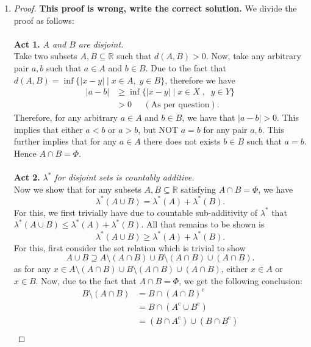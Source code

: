 \documentclass{article}
\theoremstyle{definition}
\theoremstyle{remark}
\theoremstyle{definition}
\theoremstyle{definition}
\theoremstyle{definition}
\newcommand{\abs}[1]{\left \vert #1\right \vert}
\newcommand{\union}{\cup}
\newcommand{\intrs}{\cap}
\newcommand{\where}{\;\vert\;}
\newcommand{\R}{\mathbb{R}}
\newcommand{\comp}[1]{#1^{\text{c}}}
\newcommand{\lom}[1]{\lambda^*\left (#1\right )}
\begin{document}
\begin{enumerate}
{\begin{proof}
 \end{proof}}
\item {\begin{proof} \textbf{This proof is wrong, write the correct solution.} We divide the proof as follows:\\\\
		\textbf{Act 1.} \emph{$ A $ and $ B $ are disjoint.}\\
		Take two subsets $ A,B \subseteq \R $ such that $ d(A,B) >0 $. Now, take any arbitrary pair $ a,b $ such that $ a\in A $ and $ b\in B $. Due to the fact that $ d(A,B) = \inf \{\abs{x-y}\where x\in A, \;y\in B\}$, therefore we have
		\begin{equation*}
			\begin{split}
				\abs{a-b} &\ge \inf\{ \abs{x-y}\where x\in X\;,\;\;y\in Y\}\\
				&>0 \;\;\;\;\;(\text{As per question}).
			\end{split}
		\end{equation*}
	Therefore, for any arbitrary $ a\in A $ and $ b\in B $, we have that $ \abs{a-b} >0 $. This implies that either $ a < b $ or $ a > b $, but NOT $ a = b $ for any pair $ a,b$. This further implies that for any $ a\in A $ there does not exists $ b\in B $ such that $ a=b $. Hence $ A \intrs B  = \Phi$. \\\\
	\textbf{Act 2.} \emph{$ \lambda^* $ for disjoint sets is countably additive.}\\
	Now we show that for any subsets $ A, B\subseteq \R $ satisfying $ A\intrs B =\Phi $, we have
	\[\lom{A\union B} = \lom{A} + \lom{B}.\]
	For this, we first trivially have due to countable sub-additivity of $ \lambda^* $ that $ \lom{A \union B} \le \lom{A} + \lom{B} $. All that remains to be shown is 
	\[\lom{A\union B}\ge \lom{A} + \lom{B}.\]
	For this, first consider the set relation which is trivial to show
	\[A\union B \supseteq A\setminus (A\intrs B) \union B\setminus (A\intrs B) \union (A\intrs B).\]
	as for any $ x\in A\setminus (A\intrs B) \union B\setminus (A\intrs B) \union (A\intrs B) $, either $ x\in A $ or $ x\in B $. Now, due to the fact that $ A\intrs B = \Phi $, we get the following conclusion:
	\begin{equation*}
		\begin{split}
			 B\setminus (A\intrs B) &= B\intrs \comp{(A\intrs B)}\\
			 &= B\intrs (\comp{A} \union \comp{B})\\
			 &= (B\intrs \comp{A}) \union (B\intrs \comp{B})\\

\end{split}
\end{equation*}
\end{proof}}
\end{enumerate}
\end{document}
